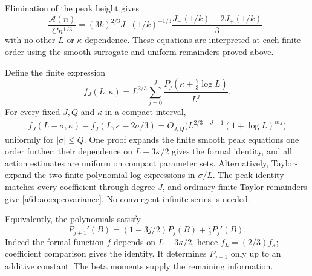 \documentclass[11pt,letterpaper]{article}
\numberwithin{equation}{section}
\theoremstyle{remark}\newtheorem{remark}[theorem]{Remark}
\newcommand{\A}{\mathcal A}
\begin{document}
Elimination of the peak height gives
\[
 \frac{\A(n)}{Cn^{1/3}}=(3k)^{2/3}J_-(1/k)^{-1/3}
 \frac{J_-(1/k)+2J_+(1/k)}3,
\]
with no other $L$ or $\kappa$ dependence. These equations are
interpreted at each finite order using the smooth surrogate and
uniform remainders proved above.

Define the finite expression
\[
 f_J(L,\kappa)=L^{2/3}\sum_{j=0}^J
 \frac{P_j(\kappa+\frac73\log L)}{L^j}.
\]
For every fixed $J,Q$ and $\kappa$ in a compact interval,
\begin{equation}\label{a61:ao:eq:covariance}
 \begin{split}
 f_J(L-\sigma,\kappa)-f_J(L,\kappa-2\sigma/3)
 =O_{J,Q}\bigl(L^{2/3-J-1}(1+\log L)^{m_J}\bigr)
 \end{split}
\end{equation}
uniformly for $|\sigma|\le Q$. One proof expands the finite smooth
peak equations one order further; their dependence on
$L+3\kappa/2$ gives the formal identity, and all action estimates are
uniform on compact parameter sets. Alternatively, Taylor-expand the
two finite polynomial-log expressions in $\sigma/L$. The peak
identity matches every coefficient through degree $J$, and ordinary
finite Taylor remainders give \eqref{a61:ao:eq:covariance}. No convergent
infinite series is needed.

Equivalently, the polynomials satisfy
\begin{equation}\label{a61:ao:eq:derivativeidentity}
 P_{j+1}'(B)=(1-3j/2)P_j(B)+\tfrac72P_j'(B).
\end{equation}
Indeed the formal function $f$ depends on $L+3\kappa/2$, hence
$f_L=(2/3)f_\kappa$; coefficient comparison gives the identity.
It determines $P_{j+1}$ only up to an additive constant. The beta
moments supply the remaining information.
\end{document}
